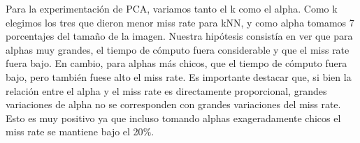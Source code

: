 \documentclass{article}
\begin{document}
Para la experimentación de PCA, variamos tanto el k como el alpha. Como k elegimos los tres que dieron menor miss rate para kNN, y como alpha tomamos 7 porcentajes del tamaño de la imagen. Nuestra hipótesis consistía en ver que para alphas muy grandes, el tiempo de cómputo fuera considerable y que el miss rate fuera bajo. En cambio, para alphas más chicos, que el tiempo de cómputo fuera bajo, pero también fuese alto el miss rate. Es importante destacar que, si bien la relación entre el alpha y el miss rate es directamente proporcional, grandes variaciones de alpha no se corresponden con grandes variaciones del miss rate. Esto es muy positivo ya que incluso tomando alphas exageradamente chicos el miss rate se mantiene bajo el 20$\%$.
\end{document}
